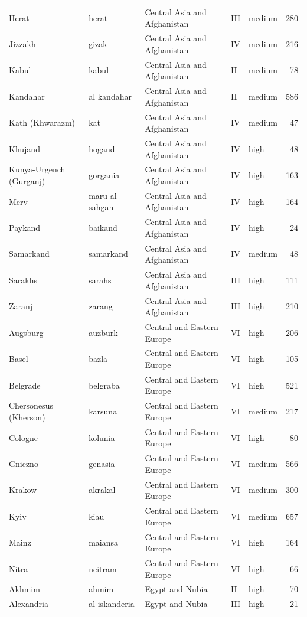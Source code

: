 \documentclass[11pt,a4paper]{article}
\begin{document}
{\begin{longtable}{p{4.6cm}p{3.0cm}p{3.6cm}llr}
Herat & herat & Central Asia and Afghanistan & III & medium & 280\\
Jizzakh & gizak & Central Asia and Afghanistan & IV & medium & 216\\
Kabul & kabul & Central Asia and Afghanistan & II & medium & 78\\
Kandahar & al kandahar & Central Asia and Afghanistan & II & medium & 586\\
Kath (Khwarazm) & kat & Central Asia and Afghanistan & IV & medium & 47\\
Khujand & hogand & Central Asia and Afghanistan & IV & high & 48\\
Kunya-Urgench (Gurganj) & gorgania & Central Asia and Afghanistan & IV & high & 163\\
Merv & maru al sahgan & Central Asia and Afghanistan & IV & high & 164\\
Paykand & baikand & Central Asia and Afghanistan & IV & high & 24\\
Samarkand & samarkand & Central Asia and Afghanistan & IV & medium & 48\\
Sarakhs & sarahs & Central Asia and Afghanistan & III & high & 111\\
Zaranj & zarang & Central Asia and Afghanistan & III & high & 210\\
Augsburg & auzburk & Central and Eastern Europe & VI & high & 206\\
Basel & bazla & Central and Eastern Europe & VI & high & 105\\
Belgrade & belgraba & Central and Eastern Europe & VI & high & 521\\
Chersonesus (Kherson) & karsuna & Central and Eastern Europe & VI & medium & 217\\
Cologne & kolunia & Central and Eastern Europe & VI & high & 80\\
Gniezno & genasia & Central and Eastern Europe & VI & medium & 566\\
Krakow & akrakal & Central and Eastern Europe & VI & medium & 300\\
Kyiv & kiau & Central and Eastern Europe & VI & medium & 657\\
Mainz & maiansa & Central and Eastern Europe & VI & high & 164\\
Nitra & neitram & Central and Eastern Europe & VI & high & 66\\
Akhmim & ahmim & Egypt and Nubia & II & high & 70\\
Alexandria & al iskanderia & Egypt and Nubia & III & high & 21\\

\end{longtable}}
\end{document}
